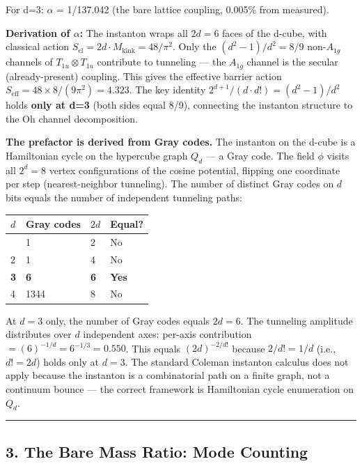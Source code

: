 \documentclass[
]{article}
\newcounter{none} %
\begin{document}
For d=3: \(\alpha\) = 1/137.042 (the bare lattice coupling, 0.005\% from
measured).

\textbf{Derivation of \(\alpha\):} The instanton wraps all \(2d = 6\)
faces of the d-cube, with classical action
\(S_{\text{cl}} = 2d \cdot M_{\text{kink}} = 48/\pi^2\). Only the
\((d^2-1)/d^2 = 8/9\) non-\(A_{1g}\) channels of
\(T_{1u} \otimes T_{1u}\) contribute to tunneling --- the \(A_{1g}\)
channel is the secular (already-present) coupling. This gives the
effective barrier action
\(S_{\text{eff}} = 48 \times 8/(9\pi^2) = 4.323\). The key identity
\(2^{d+1}/(d \cdot d!) = (d^2-1)/d^2\) holds \textbf{only at d=3} (both
sides equal 8/9), connecting the instanton structure to the Oh channel
decomposition.

\textbf{The prefactor is derived from Gray codes.} The instanton on the
d-cube is a Hamiltonian cycle on the hypercube graph \(Q_d\) --- a Gray
code. The field \(\phi\) visits all \(2^d = 8\) vertex configurations of
the cosine potential, flipping one coordinate per step (nearest-neighbor
tunneling). The number of distinct Gray codes on \(d\) bits equals the
number of independent tunneling paths:

{\def\LTcaptype{none} %
\begin{longtable}[]{@{}llll@{}}
\toprule\noalign{}
\(d\) & Gray codes & \(2d\) & Equal? \\
\midrule\noalign{}
\endhead
\bottomrule\noalign{}
\endlastfoot
1 & 1 & 2 & No \\
2 & 1 & 4 & No \\
\textbf{3} & \textbf{6} & \textbf{6} & \textbf{Yes} \\
4 & 1344 & 8 & No \\
\end{longtable}
}

At \(d=3\) only, the number of Gray codes equals \(2d = 6\). The
tunneling amplitude distributes over \(d\) independent axes: per-axis
contribution \(= (6)^{-1/d} = 6^{-1/3} = 0.550\). This equals
\((2d)^{-2/d!}\) because \(2/d! = 1/d\) (i.e., \(d! = 2d\)) holds only
at \(d=3\). The standard Coleman instanton calculus does not apply
because the instanton is a combinatorial path on a finite graph, not a
continuum bounce --- the correct framework is Hamiltonian cycle
enumeration on \(Q_d\).

\begin{center}\rule{0.5\linewidth}{0.5pt}\end{center}

\subsection{3. The Bare Mass Ratio: Mode
Counting}\label{the-bare-mass-ratio-mode-counting}
\end{document}
